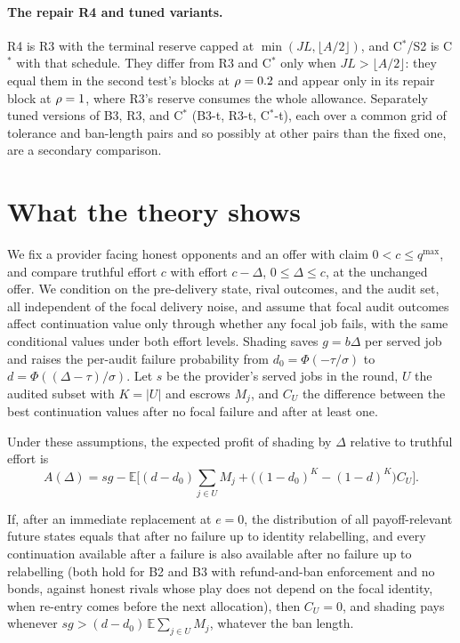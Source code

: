 \documentclass[11pt]{article}
\begin{document}
\paragraph{The repair R4 and tuned variants.} R4 is R3 with the terminal reserve capped at $\min(JL, \lfloor A/2 \rfloor)$, and C$^*$/S2 is C$^*$ with that schedule. They differ from R3 and C$^*$ only when $JL > \lfloor A/2 \rfloor$: they equal them in the second test's blocks at $\rho = 0.2$ and appear only in its repair block at $\rho = 1$, where R3's reserve consumes the whole allowance. Separately tuned versions of B3, R3, and C$^*$ (B3-t, R3-t, C$^*$-t), each over a common grid of  tolerance and ban-length pairs and so possibly at other pairs than the fixed one, are a secondary comparison.

\section{What the theory shows}\label{sec:theory}
We fix a provider facing honest opponents and an offer with claim $0 < c \le q^{\max}$, and compare truthful effort $c$ with effort $c - \Delta$, $0 \le \Delta \le c$, at the unchanged offer. We condition on the pre-delivery state, rival outcomes, and the audit set, all independent of the focal delivery noise, and assume that focal audit outcomes affect continuation value only through whether any focal job fails, with the same conditional values under both effort levels. Shading saves $g = b\Delta$ per served job and raises the per-audit failure probability from $d_0 = \Phi(-\tau/\sigma)$ to $d = \Phi((\Delta - \tau)/\sigma)$. Let $s$ be the provider's served jobs in the round, $U$ the audited subset with $K = |U|$ and escrows $M_j$, and $C_U$ the difference between the best continuation values after no focal failure and after at least one.

\begin{lemma}\label{lem:local}
Under these assumptions, the expected profit of shading by $\Delta$ relative to truthful effort is
\[ A(\Delta) = s g - \mathbb{E}\Big[(d - d_0)\textstyle\sum_{j \in U} M_j + \big((1-d_0)^K - (1-d)^K\big) C_U\Big]. \]
\end{lemma}

\begin{corollary}\label{cor:uniform}
If, after an immediate replacement at $e = 0$, the distribution of all payoff-relevant future states equals that after no failure up to identity relabelling, and every continuation available after a failure is also available after no failure up to relabelling (both hold for B2 and B3 with refund-and-ban enforcement and no bonds, against honest rivals whose play does not depend on the focal identity, when re-entry comes before the next allocation), then $C_U = 0$, and shading pays whenever $sg > (d - d_0)\,\mathbb{E}\sum_{j \in U} M_j$, whatever the ban length.
\end{corollary}
\end{document}
